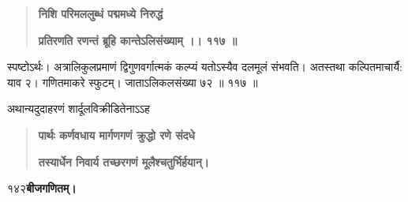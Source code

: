 \documentclass[11pt, openany]{book}
\begin{document}
\begin{sloppypar}
\begin{quote}
\hspace{1in}\textbf{निशि परिमललुब्धं पद्ममध्ये निरुद्धं}

\hspace{1in}\textbf{प्रतिरणति रणन्तं ब्रूहि कान्तेऽलिसंख्याम् ।। ११७ ॥}
\end{quote}

\hangindent=0.2in \hspace{0.2in}स्पष्टोऽर्थः। अत्रालिकुलप्रमाणं द्विगुणवर्गात्मकं कल्प्यं यतोऽस्यैव दलमूलं संभवति। अतस्तथा कल्पितमाचार्यै: याव २। गणितमाकरे स्फुटम्। जाताऽलिकलसंख्या ७२ ॥ ११७ ॥

\hangindent=0.2in \hspace{0.2in}अथान्यदुदाहरणं शार्दूलविक्रीडितेनाऽऽह\textendash

\begin{quote}
\hspace{1in}\textbf{पार्थः कर्णवधाय मार्गणगणं क्रुद्धो रणे संदधे}

\hspace{1in}\textbf{तस्यार्धेन निवार्य तच्छरगणं मूलैश्चतुर्भिर्हयान्।}
\end{quote}
\end{sloppypar}
\thispagestyle{empty}
\newpage

\onehalfspacing
१४२\hspace{2in}\textbf{बीजगणितम्।} 

\vspace{5mm}
\end{document}
